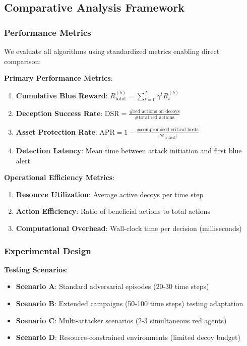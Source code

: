 \documentclass[12pt]{article}
\theoremstyle{definition}
\theoremstyle{plain}
\begin{document}
\subsection{Comparative Analysis Framework}

\subsubsection{Performance Metrics}

We evaluate all algorithms using standardized metrics enabling direct comparison:

\textbf{Primary Performance Metrics}:
\begin{enumerate}
    \item \textbf{Cumulative Blue Reward}: $R_{\text{total}}^{(b)} = \sum_{t=0}^{T} \gamma^t R_t^{(b)}$
    \item \textbf{Deception Success Rate}: $\text{DSR} = \frac{\text{\# red actions on decoys}}{\text{\# total red actions}}$
    \item \textbf{Asset Protection Rate}: $\text{APR} = 1 - \frac{\text{\# compromised critical hosts}}{|\mathcal{H}_{\text{critical}}|}$
    \item \textbf{Detection Latency}: Mean time between attack initiation and first blue alert
\end{enumerate}

\textbf{Operational Efficiency Metrics}:
\begin{enumerate}
    \item \textbf{Resource Utilization}: Average active decoys per time step
    \item \textbf{Action Efficiency}: Ratio of beneficial actions to total actions
    \item \textbf{Computational Overhead}: Wall-clock time per decision (milliseconds)
\end{enumerate}

\subsubsection{Experimental Design}

\textbf{Testing Scenarios}:
\begin{itemize}
    \item \textbf{Scenario A}: Standard adversarial episodes (20-30 time steps)
    \item \textbf{Scenario B}: Extended campaigns (50-100 time steps) testing adaptation
    \item \textbf{Scenario C}: Multi-attacker scenarios (2-3 simultaneous red agents)
    \item \textbf{Scenario D}: Resource-constrained environments (limited decoy budget)
\end{itemize}
\end{document}
